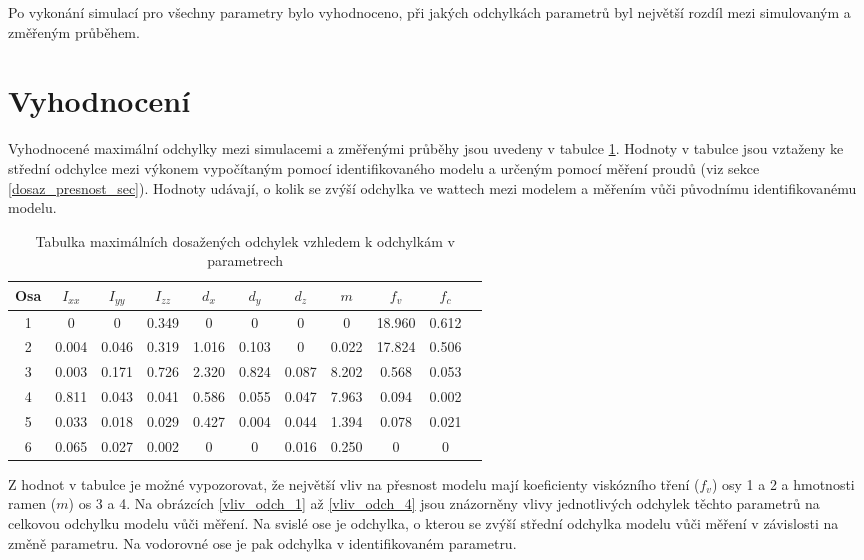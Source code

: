 Po vykonání simulací pro všechny parametry bylo vyhodnoceno, při jakých odchylkách parametrů byl největší rozdíl mezi simulovaným a změřeným průběhem. 

\section{Vyhodnocení}

Vyhodnocené maximální odchylky mezi simulacemi a změřenými průběhy jsou uvedeny v tabulce \ref{tab_odch_parametru}. Hodnoty v tabulce jsou vztaženy ke střední odchylce mezi výkonem vypočítaným pomocí identifikovaného modelu a určeným pomocí měření proudů (viz sekce \ref{dosaz_presnost_sec}). Hodnoty udávají, o kolik se zvýší odchylka ve wattech mezi modelem a měřením vůči původnímu identifikovanému modelu.

\begin{table}[htbp]
  \centering
  \caption{Tabulka maximálních dosažených odchylek vzhledem k odchylkám v parametrech}
    \begin{tabular}{c|cccccccccc}
    \multicolumn{1}{c|}{Osa} & \multicolumn{1}{c}{$I_{xx}$} & \multicolumn{1}{c}{$I_{yy}$} & \multicolumn{1}{c}{$I_{zz}$} & \multicolumn{1}{c}{$d_x$} & \multicolumn{1}{c}{$d_y$} & \multicolumn{1}{c}{$d_z$} & \multicolumn{1}{c}{$m$} & \multicolumn{1}{c}{$f_v$} & \multicolumn{1}{c}{$f_c$} \\
    \hline
    1  & 0     & 0     & 0.349 & 0     & 0     & 0     & 0     & 18.960 & 0.612 \\
    2  & 0.004 & 0.046 & 0.319 & 1.016 & 0.103 & 0     & 0.022 & 17.824 & 0.506 \\
    3  & 0.003 & 0.171 & 0.726 & 2.320 & 0.824 & 0.087 & 8.202 &  0.568 & 0.053 \\
    4  & 0.811 & 0.043 & 0.041 & 0.586 & 0.055 & 0.047 & 7.963 &  0.094 & 0.002 \\
    5  & 0.033 & 0.018 & 0.029 & 0.427 & 0.004 & 0.044 & 1.394 &  0.078 & 0.021 \\
    6  & 0.065 & 0.027 & 0.002 & 0     & 0     & 0.016 & 0.250 &  0     & 0     \\
    \end{tabular}%
  \label{tab_odch_parametru}%
\end{table}%

Z hodnot v tabulce je možné vypozorovat, že největší vliv na přesnost modelu mají koeficienty viskózního tření ($f_v$) osy 1 a 2 a hmotnosti ramen ($m$) os 3 a 4. Na obrázcích \ref{vliv_odch_1} až \ref{vliv_odch_4} jsou znázorněny vlivy jednotlivých odchylek těchto parametrů na celkovou odchylku modelu vůči měření. Na svislé ose je odchylka, o kterou se zvýší střední odchylka modelu vůči měření v závislosti na změně parametru. Na vodorovné ose je pak odchylka v identifikovaném parametru. 

